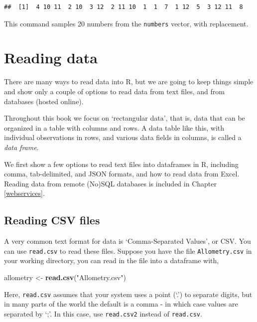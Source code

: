\documentclass[]{book}
\newenvironment{Shaded}{\begin{snugshade}}{\end{snugshade}}
\newcommand{\KeywordTok}[1]{\textcolor[rgb]{0.13,0.29,0.53}{\textbf{#1}}}
\newcommand{\NormalTok}[1]{#1}
\newcommand{\StringTok}[1]{\textcolor[rgb]{0.31,0.60,0.02}{#1}}
\begin{document}
\begin{verbatim}
##  [1]  4 10 11  2 10  3 12  2 11 10  1  1  7  1 12  5  3 12 11  8
\end{verbatim}

This command samples 20 numbers from the \texttt{numbers} vector, with replacement.

\hypertarget{readingdata}{%
\section{Reading data}\label{readingdata}}

There are many ways to read data into R, but we are going to keep things simple and show only a couple of options to read data from text files, and from databases (hosted online).

Throughout this book we focus on `rectangular data', that is, data that can be organized in a table with columns and rows. A data table like this, with individual observations in rows, and various data fields in columns, is called a \emph{data frame}.

We first show a few options to read text files into dataframes in R, including comma, tab-delimited, and JSON formats, and how to read data from Excel. Reading data from remote (No)SQL databases is included in Chapter \ref{webservices}.

\hypertarget{readcsv}{%
\subsection{Reading CSV files}\label{readcsv}}

A very common text format for data is `Comma-Separated Values', or CSV. You can use \texttt{read.csv} to read these files. Suppose you have the file \texttt{Allometry.csv} in your working directory, you can read in the file into a dataframe with,

\begin{Shaded}
\begin{Highlighting}[]
\NormalTok{allometry <-}\StringTok{ }\KeywordTok{read.csv}\NormalTok{(}\StringTok{"Allometry.csv"}\NormalTok{)}
\end{Highlighting}
\end{Shaded}

Here, \texttt{read.csv} assumes that your system uses a point (`.') to separate digits, but in many parts of the world the default is a comma - in which case values are separated by `;'. In this case, use \texttt{read.csv2} instead of \texttt{read.csv}.
\end{document}
